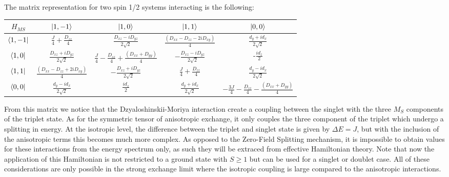 \documentclass[10pt]{report}
\numberwithin{equation}{section}
\begin{document}
The matrix representation for two spin 1/2 systems interacting is the following:
\begin{center}
    \begin{tabular}{c | c c c c}
        $H_{MS}$ & $\ket{1,-1}$ & $\ket{1,0}$ & $\ket{1,1}$ & $\ket{0,0}$\\
        \hline
        $\bra{1,-1}$ & $\frac{J}{4}+\frac{D_{zz}}{4}$ & $\frac{D_{xz}-iD_{yz}}{2\sqrt{2}}$ & $\frac{(D_{xx}-D_{zz}-2iD_{xy})}{4} $& $\frac{d_y+id_x}{2\sqrt{2}}$\\
        $\bra{1,0}$ & $\frac{D_{xz}+iD_{yz}}{2\sqrt{2}}$ &$ \frac{J}{4} -\frac{D_{zz}}{4} +\frac{(D_{xx}+D_{yy})}{4}$& $-\frac{D_{xz}-iD_{yz}}{2\sqrt{2}}$ & -$\frac{id_z}{2}$ \\
        $\bra{1,1}$ &$\frac{(D_{xx}-D_{zz}+2iD_{xy})}{4} $ & $-\frac{D_{xz}+iD_{yz}}{2\sqrt{2}}$ & $\frac{J}{4}+\frac{D_{zz}}{4}$ & $\frac{d_y-id_x}{2\sqrt{2}}$\\
        $\bra{0,0}$ & $\frac{d_y-id_x}{2\sqrt{2}}$  & $\frac{id_z}{2}$  &$\frac{d_y+id_x}{2\sqrt{2}}$  & $-\frac{3J}{4}-\frac{D_{zz}}{4}-\frac{(D_{xx}+D_{yy})}{4}$\\
    \end{tabular}
\end{center}
From this matrix we notice that the Dzyaloshinskii-Moriya interaction create a coupling between the singlet with the three $M_S$ components of the triplet state.
As for the symmetric tensor of anisotropic exchange, it only couples the three component of the triplet which undergo a splitting in energy.
At the isotropic level, the difference between the triplet and singlet state is given by $\Delta E=J$, but with the inclusion of the anisotropic terms this becomes much more complex. 
As opposed to the Zero-Field Splitting mechanism, it is impossible to obtain values for these interactions from the energy spectrum only, as such they will be extraced from effective Hamiltonian theory.
Note that now the application of this Hamiltonian is not restricted to a ground state with $S\ge1$ but can be used for a singlet or doublet case.
All of these considerations are only possible in the strong exchange limit where the isotropic coupling is large compared to the anisotropic interactions.

\end{document}
